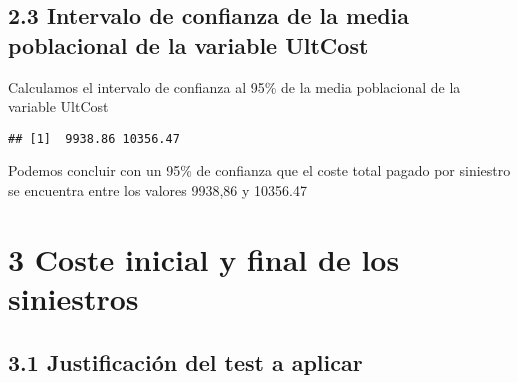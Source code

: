 \documentclass[
  a4paper]{article}
\newenvironment{Shaded}{\begin{snugshade}}{\end{snugshade}}
\newcommand{\AttributeTok}[1]{\textcolor[rgb]{0.77,0.63,0.00}{#1}}
\newcommand{\ConstantTok}[1]{\textcolor[rgb]{0.00,0.00,0.00}{#1}}
\newcommand{\DecValTok}[1]{\textcolor[rgb]{0.00,0.00,0.81}{#1}}
\newcommand{\FloatTok}[1]{\textcolor[rgb]{0.00,0.00,0.81}{#1}}
\newcommand{\FunctionTok}[1]{\textcolor[rgb]{0.00,0.00,0.00}{#1}}
\newcommand{\NormalTok}[1]{#1}
\newcommand{\OtherTok}[1]{\textcolor[rgb]{0.56,0.35,0.01}{#1}}
\newcommand{\SpecialCharTok}[1]{\textcolor[rgb]{0.00,0.00,0.00}{#1}}
\begin{document}
\hypertarget{intervalo-de-confianza-de-la-media-poblacional-de-la-variable-ultcost}{%
\subsection{2.3 Intervalo de confianza de la media poblacional de la
variable
UltCost}\label{intervalo-de-confianza-de-la-media-poblacional-de-la-variable-ultcost}}

Calculamos el intervalo de confianza al 95\% de la media poblacional de
la variable UltCost

\begin{Shaded}
\end{Shaded}

\begin{verbatim}
## [1]  9938.86 10356.47
\end{verbatim}

Podemos concluir con un 95\% de confianza que el coste total pagado por
siniestro se encuentra entre los valores 9938,86 y 10356.47

\hypertarget{coste-inicial-y-final-de-los-siniestros}{%
\section{3 Coste inicial y final de los
siniestros}\label{coste-inicial-y-final-de-los-siniestros}}

\hypertarget{justificaciuxf3n-del-test-a-aplicar}{%
\subsection{3.1 Justificación del test a
aplicar}\label{justificaciuxf3n-del-test-a-aplicar}}
\end{document}
